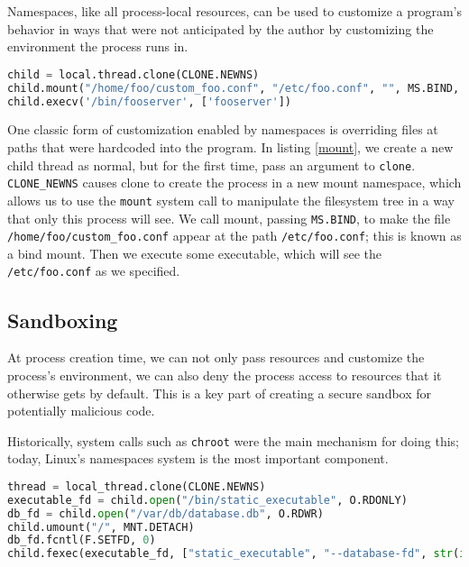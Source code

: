 \documentclass{acmart}
\begin{document}
Namespaces, like all process-local resources,
can be used to customize a program's behavior
in ways that were not anticipated by the author
by customizing the environment the process runs in.

\begin{lstlisting}[float,language=Python,label={mount},caption={Overriding absolute path using a mount namespace}]
child = local.thread.clone(CLONE.NEWNS)
child.mount("/home/foo/custom_foo.conf", "/etc/foo.conf", "", MS.BIND, "")
child.execv('/bin/fooserver', ['fooserver'])
\end{lstlisting}

One classic form of customization enabled by namespaces
is overriding files at paths that were hardcoded into the program.
In listing \ref{mount},
we create a new child thread as normal,
but for the first time,
pass an argument to \texttt{clone}.
\verb|CLONE_NEWNS| causes clone to create the process in a new mount namespace,
which allows us to use the \texttt{mount} system call
to manipulate the filesystem tree in a way that only this process will see.
We call mount, passing \texttt{MS.BIND}, to make the file \verb|/home/foo/custom_foo.conf|
appear at the path \verb|/etc/foo.conf|;
this is known as a bind mount.
Then we execute some executable,
which will see the \verb|/etc/foo.conf| as we specified.
\subsection{Sandboxing}
At process creation time,
we can not only pass resources and customize the process's environment,
we can also deny the process access to resources that it otherwise gets by default.
This is a key part of creating a secure sandbox for potentially malicious code.

Historically, system calls such as \texttt{chroot} were the main mechanism for doing this;
today, Linux's namespaces system is the most important component.

\begin{lstlisting}[float,language=Python,label={unmount},caption={Unmount all and run executable via fexec}]
thread = local_thread.clone(CLONE.NEWNS)
executable_fd = child.open("/bin/static_executable", O.RDONLY)
db_fd = child.open("/var/db/database.db", O.RDWR)
child.umount("/", MNT.DETACH)
db_fd.fcntl(F.SETFD, 0)
child.fexec(executable_fd, ["static_executable", "--database-fd", str(int(db_fd))])
\end{lstlisting}
\end{document}
